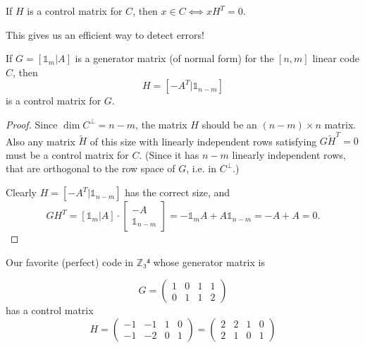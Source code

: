 \documentclass[english]{lbscript}
\begin{document}
\begin{remark}{}{}
  If \(H\) is a control matrix for \(C\), then \(x∈C⟺xH^{T}=0\).

  This gives us an efficient way to detect errors!
\end{remark}

\begin{theorem}{}{}
  If \(G=[𝟙_{m}|A]\) is a generator matrix (of normal form) for the \([n, m]\) linear code \(C\), then
  \begin{equation}
    \label{eq:142}
    H= \left[ -A^{T}| 𝟙_{n-m} \right]
  \end{equation}
  is a control matrix for \(G\).
\end{theorem}
\begin{proof}
  Since \(\dim C^{⟂}=n-m\), the matrix \(H\) should be an \((n-m)×n\) matrix. Also any matrix \(\tilde{H}\) of this size with linearly independent rows satisfying \(G\tilde{H}^{T}=0\) must be a control matrix for \(C\). (Since it has \(n-m\) linearly independent rows, that are orthogonal to the row space of \(G\), i.e. in \(C^{⟂}\).)

  Clearly \(H=[-A^{T}|𝟙_{n-m}]\) has the correct size, and
  \begin{equation}
    \label{eq:143}
    GH^{T}=[𝟙_{m}|A]⋅ \begin{bmatrix} -A \\ 𝟙_{n-m} \end{bmatrix} = -𝟙_{m}A+A𝟙_{n-m}=-A+A=0.
  \end{equation}
\end{proof}

\begin{example}{}{}
  Our favorite (perfect) code in \(ℤ₃⁴\) whose generator matrix is

  \begin{equation}
    \label{eq:144}
    G= \begin{pmatrix}
      1 & 0 & 1 & 1 \\
      0 & 1 & 1 & 2
    \end{pmatrix}
  \end{equation}
  has a control matrix
  \begin{equation}
    \label{eq:145}
    H = \begin{pmatrix} -1&-1&1&0\\-1&-2&0&1 \end{pmatrix}
    = \begin{pmatrix}
      2 & 2 & 1 & 0 \\
      2 & 1 & 0 & 1
    \end{pmatrix}
  \end{equation}
\end{example}
\end{document}
